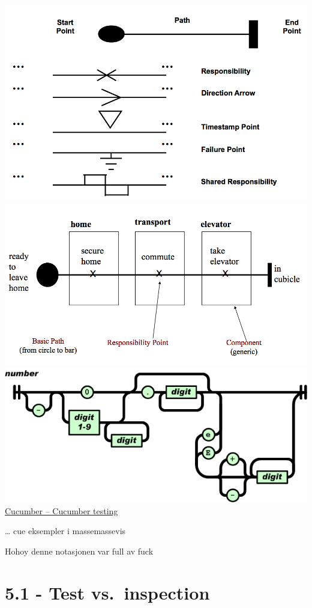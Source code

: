 \includegraphics{Forelesning 11/img/ucm-path.png}
\includegraphics{Forelesning 11/img/ucm-path-example.png}
\includegraphics{Forelesning 11/img/number.png}
\href{http://cukes.info/}{Cucumber -- Cucumber testing}

\ldots{} cue eksempler i massemassevis

Hohoy denne notasjonen var full av fuck

\section{5.1 - Test vs.~inspection}

